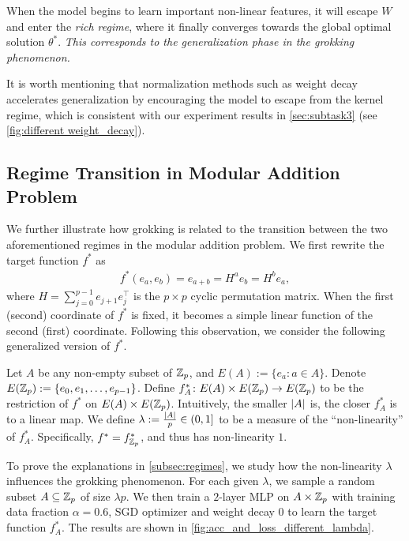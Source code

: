 When the model begins to learn important non-linear features, it will escape $W$ and enter the \emph{rich regime}, where it finally converges towards the global optimal solution $\theta^*$.
\emph{This corresponds to the generalization phase in the grokking phenomenon.}

It is worth mentioning that normalization methods such as weight decay accelerates generalization by encouraging the model to escape from the kernel regime, which is consistent with our experiment results in \cref{sec:subtask3} (see \cref{fig:different weight_decay}).


\subsection{Regime Transition in Modular Addition Problem}
\label{subsec:explain_by_regimes}

We further illustrate how grokking is related to the transition between the two aforementioned regimes in the modular addition problem.
We first rewrite the target function $f^*$ as 
\begin{align*}
    f^*(e_a, e_b) = e_{a+b} = H^a e_b = H^b e_a, 
\end{align*}
where $H = \sum_{j=0}^{p-1} e_{j+1} e_{j}^\top$ is the $p \times p$ cyclic permutation matrix.
When the first (second) coordinate of $f^*$ is fixed, it becomes a simple linear function of the second (first) coordinate.
Following this observation, we consider the following generalized version of $f^*$.

Let $A$ be any non-empty subset of $\mathbb{Z}_p$, and $E(A) := \{e_a \colon a \in A\}$. Denote $E(\mathbb{Z}_p) := \{e_0, e_1, \dots, e_{p-1}\}$.
Define $f_A^* \colon E(A) \times E(\mathbb{Z}_p) \to E(\mathbb{Z}_p)$ to be the restriction of $f^*$ on $E(A) \times E(\mathbb{Z}_p)$.
Intuitively, the smaller $| A |$ is, the closer $f_A^*$ is to a linear map.
We define $\lambda := \frac{| A |}{p} \in (0, 1]$ to be a measure of the ``non-linearity'' of $f_A^*$.
Specifically, $f^* = f_{\mathbb{Z}_p}^*$, and thus has non-linearity $1$.

To prove the explanations in \cref{subsec:regimes}, we study how the non-linearity $\lambda$ influences the grokking phenomenon.
For each given $\lambda$, we sample a random subset $A \subseteq \mathbb{Z}_p$ of size $\lambda p$.
We then train a $2$-layer MLP on $A \times \mathbb{Z}_p$ with training data fraction $\alpha = 0.6$, SGD optimizer and weight decay $0$ to learn the target function $f_A^*$.
The results are shown in \cref{fig:acc_and_loss_different_lambda}.

